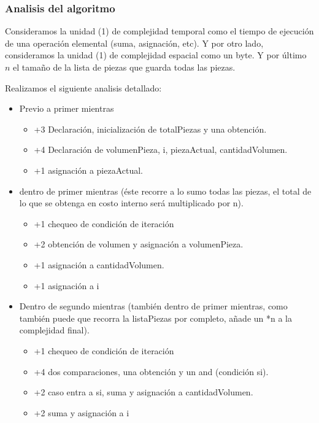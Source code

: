\documentclass{article}
\begin{document}
\subsubsection{Analisis del algoritmo}

Consideramos la unidad (1) de complejidad temporal como el tiempo de ejecución de una operación elemental (suma, asignación, etc). 
Y por otro lado, consideramos la unidad (1) de complejidad espacial como un byte. Y por último \(n\) el tamaño de la lista de piezas que guarda todas las piezas.

Realizamos el siguiente analisis detallado:

\begin{itemize}
    \item Previo a primer mientras
    \begin{itemize}
        \item +3 Declaración, inicialización de totalPiezas y una obtención.
        \item +4 Declaración de volumenPieza, i, piezaActual, cantidadVolumen.
        \item +1 asignación a piezaActual.
    \end{itemize}
    \item dentro de primer mientras (éste recorre a lo sumo todas las piezas, el total de lo que se obtenga en costo interno será multiplicado por n).
    \begin{itemize}
        \item +1 chequeo de condición de iteración
        \item +2 obtención de volumen y asignación a volumenPieza.
        \item +1 asignación a cantidadVolumen.
        \item +1 asignación a i
    \end{itemize}
    \item Dentro de segundo mientras (también dentro de primer mientras, como también puede que recorra la listaPiezas por completo, añade un *n a la complejidad final).
    \begin{itemize}
        \item +1 chequeo de condición de iteración
        \item +4 dos comparaciones, una obtención y un and (condición si).
        \item +2 caso entra a si, suma y asignación a cantidadVolumen.
        \item +2 suma y asignación a i        
    \end{itemize}

\end{itemize}
\end{document}
